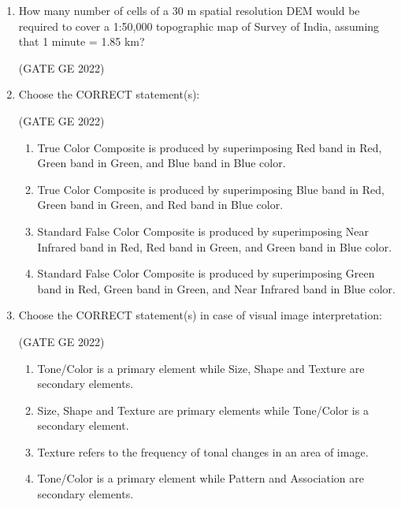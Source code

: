 \documentclass[journal,12pt,onecolumn]{IEEEtran}
\theoremstyle{remark}
\begin{document}
\begin{enumerate}
\item How many number of cells of a 30 m spatial resolution DEM would be required to cover a 1:50,000 topographic map of Survey of India, assuming that 1 minute = 1.85 km?

\hfill (GATE GE 2022)

\begin{enumerate}
\end{enumerate}

\item Choose the CORRECT statement(s):

\hfill (GATE GE 2022)

\begin{enumerate}
    \item True Color Composite is produced by superimposing Red band in Red, Green band in Green, and Blue band in Blue color.
    \item True Color Composite is produced by superimposing Blue band in Red, Green band in Green, and Red band in Blue color.
    \item Standard False Color Composite is produced by superimposing Near Infrared band in Red, Red band in Green, and Green band in Blue color.
    \item Standard False Color Composite is produced by superimposing Green band in Red, Green band in Green, and Near Infrared band in Blue color.
\end{enumerate}

\item Choose the CORRECT statement(s) in case of visual image interpretation:

\hfill (GATE GE 2022)

\begin{enumerate}
    \item Tone/Color is a primary element while Size, Shape and Texture are secondary elements.
    \item Size, Shape and Texture are primary elements while Tone/Color is a secondary element.
    \item Texture refers to the frequency of tonal changes in an area of image.
    \item Tone/Color is a primary element while Pattern and Association are secondary elements.
\end{enumerate}


\end{enumerate}
\end{document}
